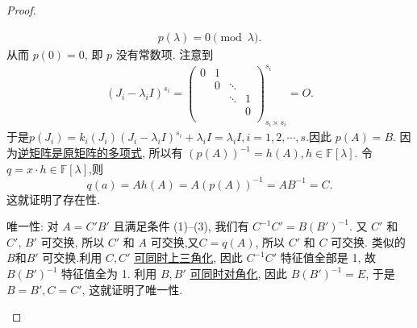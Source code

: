 \documentclass[../../main.tex]{subfiles}
\begin{document}
\begin{proof}
\begin{enumerate}
\begin{gather*}
p(\lambda) = 0 \pmod{\lambda}.
\end{gather*}
从而  \( p(0) = 0 \), 即 \( p \) 没有常数项.
注意到
\begin{align*}
\left( J_i-\lambda _iI \right) ^{s_i}=\left( \begin{matrix}
0&		1&		&		\\
&		0&		\ddots&		\\
&		&		\ddots&		1\\
&		&		&		0\\
\end{matrix} \right) _{s_i\times s_i}^{s_i}=O.
\end{align*}
于是$p(J_i)=k_i\left( J_i \right) \left( J_i-\lambda _iI \right) ^{s_i}+\lambda _iI=\lambda _iI,i=1,2,\cdots ,s.$因此 \( p(A) = B.\)
因为\hyperref[proposition:矩阵的逆可以用其多项式表示]{逆矩阵是原矩阵的多项式}, 所以有 \( (p(A))^{-1} = h(A), h \in \mathbb{F}[\lambda] \). 令 \( q = x \cdot h \in \mathbb{F}[\lambda] \),则
$$
q(a)=Ah(A)=A(p(A))^{-1}=AB^{-1}=C.
$$
这就证明了存在性.

{\heiti 唯一性:} 对 \( A = C'B' \) 且满足条件 (1)--(3), 我们有 \( C^{-1}C' = B(B')^{-1} \). 又 \( C' \) 和 \( C' \), \( B' \) 可交换, 所以 \( C' \) 和 \( A \) 可交换,又$C=q(A)$, 所以 \( C' \) 和 \( C \) 可交换. 类似的 \( B\)和\( B' \) 可交换.利用 \( C, C' \) \hyperref[proposition:一族两两可交换的一般域上的矩阵可同时上三角化]{可同时上三角化}, 因此 \( C^{-1}C' \) 特征值全部是 1, 故 \( B(B')^{-1} \) 特征值全为 1. 利用 \( B, B' \) \hyperref[proposition:一族两两可交换的可对角化矩阵可同时相似对角化]{可同时对角化}, 因此 \( B(B')^{-1} = E \), 于是 \( B = B', C = C' \), 这就证明了唯一性.
\end{enumerate}

\end{proof}
\end{document}
